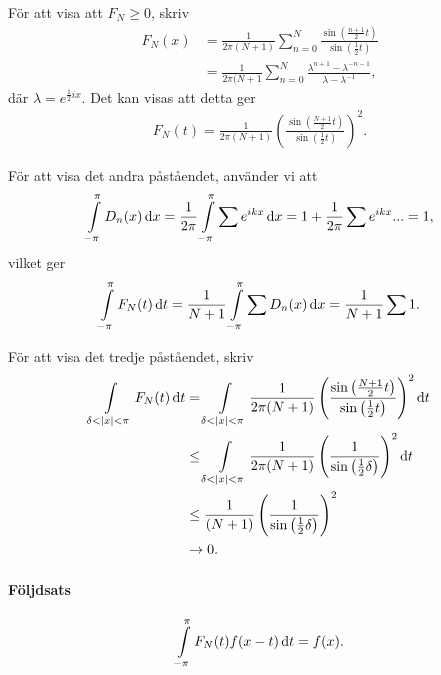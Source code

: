 För att visa att $F_{N} \geq 0$, skriv
\begin{align*}
	F_{N}(x) &= \frac{1}{2\pi(N + 1)}\sum\limits_{n = 0}^{N}\frac{\sin{\left(\frac{n + 1}{2}t\right)}}{\sin{\left(\frac{1}{2}t\right)}} \\
	         &= \frac{1}{2\pi(N + 1}\sum\limits_{n = 0}^{N}\frac{\lambda^{n + 1} - \lambda^{-n - 1}}{\lambda - \lambda^{-1}},
\end{align*}
där $\lambda = e^{\frac{1}{2}ix}$. Det kan visas att detta ger
\begin{align*}
	F_{N}(t) = \frac{1}{2\pi (N + 1)}\left(\frac{\sin{\left(\frac{N + 1}{2}t\right)}}{\sin{\left(\frac{1}{2}t\right)}}\right)^{2}.
\end{align*}

För att visa det andra påståendet, använder vi att
\begin{align*}
	\int\limits_{-\pi}^{\pi}D_{n}(x)\dd{x} = \frac{1}{2\pi}\int\limits_{-\pi}^{\pi}\sum\limits_{}^{}e^{ikx}\dd{x} = 1 + \frac{1}{2\pi}\sum\limits_{}^{}e^{ikx}... = 1,
\end{align*}
vilket ger
\begin{align*}
	\int\limits_{-\pi}^{\pi}F_{N}(t)\dd{t} = \frac{1}{N + 1}\int\limits_{-\pi}^{\pi}\sum\limits_{}^{}D_{n}(x)\dd{x} = \frac{1}{N + 1}\sum\limits_{}^{}1.
\end{align*}

För att visa det tredje påståendet, skriv
\begin{align*}
	\int\limits_{\delta < \abs{x} < \pi}^{}F_{N}(t)\dd{t} &= \int\limits_{\delta < \abs{x} < \pi}^{}\frac{1}{2\pi (N + 1)}\left(\frac{\sin{\left(\frac{N + 1}{2}t\right)}}{\sin{\left(\frac{1}{2}t\right)}}\right)^{2}\dd{t} \\
	                                                &\leq \int\limits_{\delta < \abs{x} < \pi}^{}\frac{1}{2\pi (N + 1)}\left(\frac{1}{\sin{\left(\frac{1}{2}\delta\right)}}\right)^{2}\dd{t} \\
	                                                &\leq \frac{1}{(N + 1)}\left(\frac{1}{\sin{\left(\frac{1}{2}\delta\right)}}\right)^{2} \\
	                                                &\to 0. 
\end{align*}

\paragraph{Följdsats}
\begin{align*}
	\int\limits_{-\pi}^{\pi}F_{N}(t)f(x - t)\dd{t} = f(x).
\end{align*}

